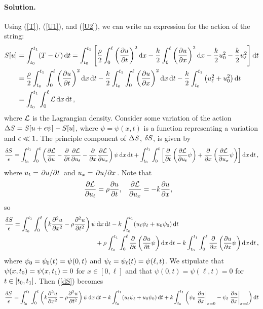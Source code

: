 \documentclass[11pt]{article}
\newcommand{\refeq}[1]{(\ref{#1})}
\newenvironment{solution}
{
    \paragraph{Solution.}
    \ignorespaces
}
{
}
\begin{document}
\begin{solution}
	Using \refeq{T}, \refeq{U1}, and \refeq{U2}, we can write an expression for the action of the string:
	\begin{align} \label{action}
		S[u] &= \int_{t_0}^{t_1} (T - U) \dd{t} = \int_{t_0}^{t_1} \left[ \frac{\rho}{2} \int_0^\ell \bigg( \pdv{u}{t} \bigg)^2 \dd{x} - \frac{k}{2} \int_0^\ell \bigg( \pdv{u}{x} \bigg)^2 \dd{x} - \frac{k}{2} u_0^2 - \frac{k}{2} u_\ell^2 \right] \dd{t} \\
		&= \frac{\rho}{2} \int_{t_0}^{t_1} \int_0^\ell \bigg( \pdv{u}{t} \bigg)^2 \dd{x} \dd{t} - \frac{k}{2} \int_{t_0}^{t_1} \int_0^\ell \bigg( \pdv{u}{x} \bigg)^2 \dd{x} \dd{t} - \frac{k}{2} \int_{t_0}^{t_1} \left( u_\ell^2 + u_0^2 \right) \dd{t} \\
		&= \int_{t_0}^{t_1} \int_0^\ell \mathcal{L} \dd{x} \dd{t},
	\end{align}
	where $\mathcal{L}$ is the Lagrangian density.  Consider some variation of the action $\Delta S = S[u + \epsilon \psi] - S[u]$, where $\psi = \psi(x, t)$ is a function representing a variation and $\epsilon \ll 1$.  The principle component of $\Delta S$, $\delta S$, is given by
	\begin{equation}
		\frac{\delta S}{\epsilon} = \int_{t_0}^{t_1} \int_0^\ell \left( \pdv{\mathcal{L}}{u} - \pdv{}{t} \pdv{\mathcal{L}}{u_t} - \pdv{}{x} \pdv{\mathcal{L}}{u_x} \right) \psi \dd{x} \dd{t} + \int_{t_0}^{t_1} \int_0^\ell \left[ \pdv{}{t} \left( \pdv{\mathcal{L}}{u_t} \psi \right) + \pdv{}{x} \left( \pdv{\mathcal{L}}{u_x} \psi \right) \right] \dd{x} \dd{t},
	\end{equation}
	where $u_t = \pdv*{u}{t}$ and $u_x = \pdv*{u}{x}$.  Note that
	\begin{align}
		\pdv{\mathcal{L}}{u_t} &= \rho \pdv{u}{t}, &
		\pdv{\mathcal{L}}{u_x} &= -k \pdv{u}{x},
	\end{align}
	so
	\begin{align} \label{dS}
		\frac{\delta S}{\epsilon} = \int_{t_0}^{t_1} \int_0^\ell \left( k \pdv[2]{u}{x} - \rho \pdv[2]{u}{t} \right) \psi &\dd{x} \dd{t} - k \int_{t_0}^{t_1} (u_\ell \psi_\ell + u_0 \psi_0) \dd{t} \notag \\
		& + \rho \int_{t_0}^{t_1} \int_0^\ell \pdv{}{t} \left( \pdv{u}{t} \psi \right) \dd{x} \dd{t} - k \int_{t_0}^{t_1} \int_0^\ell \pdv{}{x} \left( \pdv{u}{x} \psi \right) \dd{x} \dd{t},
	\end{align}
	where $\psi_0 = \psi_0(t) = \psi(0, t)$ and $\psi_\ell = \psi_\ell(t) = \psi(\ell, t)$.  We stipulate that $\psi(x, t_0) = \psi(x, t_1) = 0$ for $x \in [0, \ell]$ and that $\psi(0, t) = \psi(\ell, t) = 0$ for $t \in [t_0, t_1]$.  Then \refeq{dS} becomes
	\begin{align}
		\frac{\dS}{\eps} &= \intt \intx \left( k \pdv[2]{u}{x} - \rho \pdv[2]{u}{t} \right) \psi \dd{x} \dd{t} - k \intt (\uel \psil + \uo \psio) \dd{t} + k \intt \left( \psio \left. \pdv{u}{x} \right|_{x=0} - \psil \left. \pdv{u}{x} \right|_{x=\ell} \right) \dd{t} \label{psit} \\

\end{align}
\end{solution}
\end{document}
